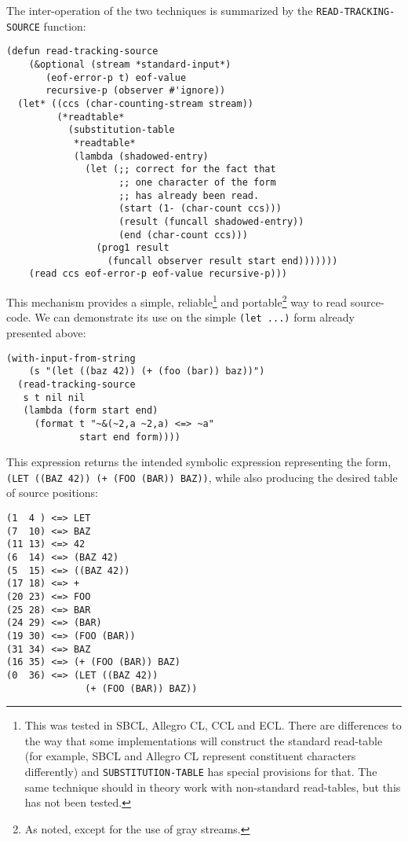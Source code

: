 \documentclass[sigconf]{acmart}
\begin{document}
The inter-operation of the two techniques is summarized by the
\texttt{READ-TRACKING-SOURCE} function:

\begin{verbatim}
(defun read-tracking-source
    (&optional (stream *standard-input*)
       (eof-error-p t) eof-value
       recursive-p (observer #'ignore))
  (let* ((ccs (char-counting-stream stream))
         (*readtable*
           (substitution-table
            *readtable*
            (lambda (shadowed-entry)
              (let (;; correct for the fact that
                    ;; one character of the form
                    ;; has already been read.
                    (start (1- (char-count ccs)))
                    (result (funcall shadowed-entry))
                    (end (char-count ccs)))
                (prog1 result
                  (funcall observer result start end)))))))
    (read ccs eof-error-p eof-value recursive-p)))
\end{verbatim}

This mechanism provides a simple, reliable\footnote{This was tested in
  SBCL, Allegro CL, CCL and ECL.  There are differences to the way
  that some implementations will construct the standard read-table
  (for example, SBCL and Allegro CL represent constituent characters
  differently) and \texttt{SUBSTITUTION-TABLE} has special provisions
  for that.  The same technique should in theory work with
  non-standard read-tables, but this has not been tested.} and
portable\footnote{As noted, except for the use of gray streams.}  way
to read source-code.  We can demonstrate its use on the simple
\texttt{(let ...)} form already presented above:

\begin{verbatim}
(with-input-from-string
    (s "(let ((baz 42)) (+ (foo (bar)) baz))")
  (read-tracking-source
   s t nil nil
   (lambda (form start end)
     (format t "~&(~2,a ~2,a) <=> ~a"
             start end form))))
\end{verbatim}

This expression returns the intended symbolic expression representing
the form, \texttt{(LET ((BAZ 42)) (+ (FOO (BAR)) BAZ))}, while also
producing the desired table of source positions:

\begin{verbatim}
(1  4 ) <=> LET
(7  10) <=> BAZ
(11 13) <=> 42
(6  14) <=> (BAZ 42)
(5  15) <=> ((BAZ 42))
(17 18) <=> +
(20 23) <=> FOO
(25 28) <=> BAR
(24 29) <=> (BAR)
(19 30) <=> (FOO (BAR))
(31 34) <=> BAZ
(16 35) <=> (+ (FOO (BAR)) BAZ)
(0  36) <=> (LET ((BAZ 42))
              (+ (FOO (BAR)) BAZ))
\end{verbatim}
\end{document}
